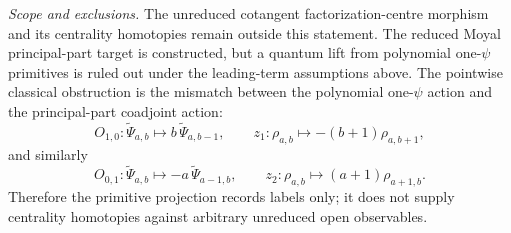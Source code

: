 \begin{stmt}
  \emph{Scope and exclusions.} The unreduced cotangent factorization-centre
  morphism and its centrality homotopies remain outside this statement.  The
  reduced Moyal principal-part target is constructed, but a quantum lift
  from polynomial one-\(\psi\) primitives is ruled out under the
  leading-term assumptions above.  The pointwise classical obstruction
  is the mismatch between the polynomial one-\(\psi\) action and the
  principal-part coadjoint action:
  \[
    O_{1,0}:\widetilde\Psi_{a,b}\mapsto b\,\widetilde\Psi_{a,b-1},
    \qquad
    z_1:\rho_{a,b}\mapsto-(b+1)\rho_{a,b+1},
  \]
  and similarly
  \[
    O_{0,1}:\widetilde\Psi_{a,b}\mapsto
      -a\,\widetilde\Psi_{a-1,b},
    \qquad
    z_2:\rho_{a,b}\mapsto(a+1)\rho_{a+1,b}.
  \]
  Therefore the primitive projection records labels only; it does not
  supply centrality homotopies against arbitrary unreduced open
  observables.
\end{stmt}

